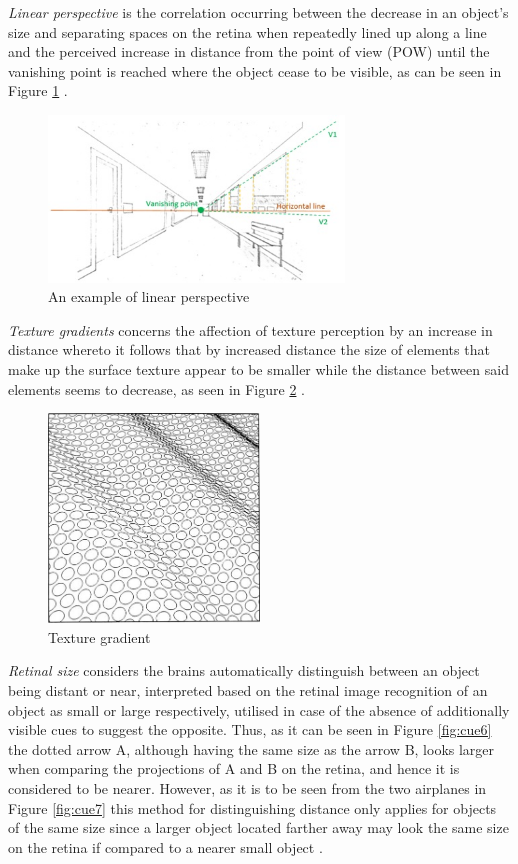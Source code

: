 \textit{Linear perspective} is the correlation occurring between the decrease in an object’s size and separating spaces on the retina when repeatedly lined up along a line and the perceived increase in distance from the point of view (POW) until the vanishing point is reached where the object cease to be visible, as can be seen in Figure \ref{fig:cue4} \cite{Gale}.

\begin{figure}[h!]
   \centering
   \includegraphics[width=0.7\textwidth]{figures/cue4.jpg}
   \caption{An example of linear perspective}\label{fig:cue4}
\end{figure}

\textit{Texture gradients} concerns the affection of texture perception by an increase in distance whereto it follows that by increased distance the size of elements that make up the surface texture appear to be smaller while the distance between said elements seems to decrease, as seen in Figure \ref{fig:cue5} \cite{Gale}.

\begin{figure}[h!]
   \centering
   \includegraphics[width=0.5\textwidth]{figures/cue5.jpg}
   \caption{Texture gradient \cite{Heeger}}\label{fig:cue5}
\end{figure}

\textit{Retinal size} considers the brains automatically distinguish between an object being distant or near, interpreted based on the retinal image recognition of an object as small or large respectively, utilised in case of the absence of additionally visible cues to suggest the opposite. Thus, as it can be seen in Figure \ref{fig:cue6} the dotted arrow A, although having the same size as the arrow B, looks larger when comparing the projections of A and B on the retina, and hence it is considered to be nearer. However, as it is to be seen from the two airplanes in Figure \ref{fig:cue7} this method for distinguishing distance only applies for objects of the same size since a larger object located farther away may look the same size on the retina if compared to a nearer small object \cite{Gale}.

